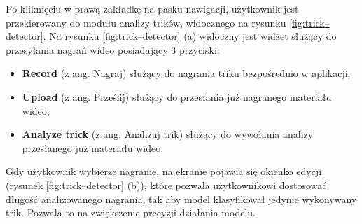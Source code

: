        Po kliknięciu w prawą zakładkę na pasku nawigacji, użytkownik jest przekierowany do modułu analizy trików, widocznego na rysunku \ref{fig:trick–detector}. Na rysunku \ref{fig:trick–detector} (a) widoczny jest widżet służący do przesyłania nagrań wideo posiadający 3 przyciski:
        \begin{itemize}
        \item \textbf{Record} (z ang. Nagraj) służący do nagrania triku bezpośrednio w aplikacji,
        \item \textbf{Upload} (z ang. Prześlij) służący do przesłania już nagranego materiału wideo,
        \item \textbf{Analyze trick} (z ang. Analizuj trik) służący do wywołania analizy przesłanego już materiału wideo.
        \end{itemize}

        Gdy użytkownik wybierze nagranie, na ekranie pojawia się okienko edycji (rysunek \ref{fig:trick–detector} (b)), które pozwala użytkownikowi dostosować długość analizowanego nagrania, tak aby model klasyfikował jedynie wykonywany trik. Pozwala to na zwiększenie precyzji działania modelu.

